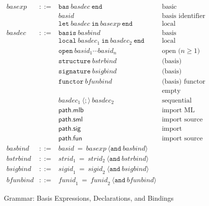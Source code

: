 \documentclass[draft]{article}
\renewcommand{\mit}[1]{\mathit{#1}}
\newcommand{\mtt}[1]{\mathtt{#1}}
\newcommand{\msf}[1]{\mathsf{#1}}
\begin{document}
\begin{figure}[h]
\begin{displaymath}
\begin{array}{rcll}
\mit{basexp} & ::= & 
\mtt{bas}~ \mit{basdec} ~\mtt{end} 
& \mbox{basic} \\&& 
\mit{basid} 
& \mbox{basis identifier} \\&&
\mtt{let}~ \mit{basdec} ~\mtt{in}~ \mit{basexp} ~\mtt{end} 
& \mbox{local declaration} \\

\mit{basdec} & ::= & 
\mtt{basis}~ \mit{basbind}
& \mbox{basis} \\&&
\mtt{local}~ \mit{basdec}_1 ~\mtt{in}~ \mit{basdec}_2 ~\mtt{end} 
& \mbox{local} \\&&
\mtt{open}~ \mit{basid}_1 \cdots \mit{basid}_n 
& \mbox{open ($n \geq 1$)} \\&&
\mtt{structure}~ \mit{bstrbind}
& \mbox{(basis) structure binding} \\&&
\mtt{signature}~ \mit{bsigbind}
& \mbox{(basis) signature binding} \\&&
\mtt{functor}~ \mit{bfunbind}
& \mbox{(basis) functor binding} \\&&
\quad
& \mbox{empty} \\&&
\mit{basdec}_1~\langle\mtt{;}\rangle~\mit{basdec}_2 
& \mbox{sequential} \\&&
\msf{path.mlb} &
\mbox{import ML basis} \\&&
\msf{path.sml} 
& \mbox{import source} \\&&
\msf{path.sig} 
& \mbox{import signature} \\&&
\msf{path.fun} 
& \mbox{import source (functor)} \\

\mit{basbind} & ::= &  
\mit{basid} ~\mtt{=}~ \mit{basexp} ~\langle\mtt{and}~ \mit{basbind}\rangle \\
\mit{bstrbind} & ::= &  
\mit{strid}_1 ~\mtt{=}~ \mit{strid}_2 ~\langle\mtt{and}~ \mit{bstrbind}\rangle \\
\mit{bsigbind} & ::= &  
\mit{sigid}_1 ~\mtt{=}~ \mit{sigid}_2 ~\langle\mtt{and}~ \mit{bsigbind}\rangle \\
\mit{bfunbind} & ::= &  
\mit{funid}_1 ~\mtt{=}~ \mit{funid}_2 ~\langle\mtt{and}~ \mit{bfunbind}\rangle
\end{array}
\end{displaymath}
\caption{Grammar: Basis Expressions, Declarations, and Bindings}\label{fig:mlb:S:GrammaticalRules}
\end{figure}
%
\end{document}
